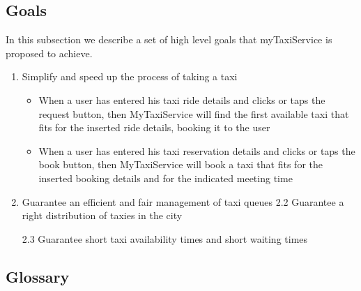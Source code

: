 \documentclass[11pt]{article} %
\begin{document}
    \subsection{Goals}
      In this subsection we describe a set of high level goals that myTaxiService is proposed to achieve.\newline
      \begin{enumerate}
        \item Simplify and speed up the process of taking a taxi
        \begin{itemize}
          \item When a user has entered his taxi ride details and clicks or taps
          the request button, then MyTaxiService will find the first
          available taxi that fits for the inserted ride details, booking it to the user

          \item When a user has entered his taxi reservation details and clicks or taps
          the book button, then MyTaxiService will book a taxi that fits for the
          inserted booking details and for the indicated meeting time
        \end{itemize}
        \item Guarantee an efficient and fair management of taxi queues
          2.2 Guarantee a right distribution of taxies in the city

          2.3 Guarantee short taxi availability times and short waiting times
      \end{enumerate}
    \subsection{Glossary}
\end{document}
